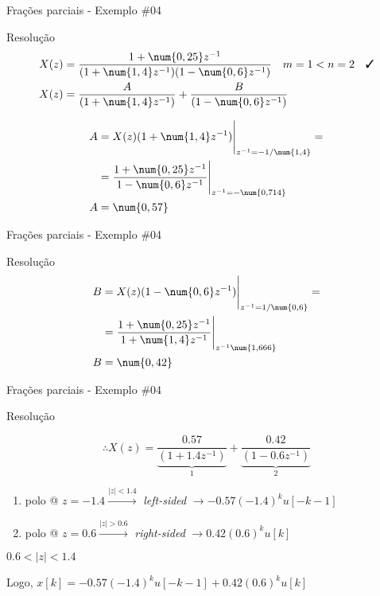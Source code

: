 \begin{frame}{Frações parciais - Exemplo \#04}
\begin{block}{Resolução}
	\begin{align*}
	X(z)&=\dfrac{1+\num{0,25}z^{-1}}{(1+\num{1,4}z^{-1})(1-\num{0,6}z^{-1})}\quad m=1<n=2\quad\text{\cmark}\\
	X(z)&=\dfrac{A}{(1+\num{1,4}z^{-1})}+\dfrac{B}{(1-\num{0,6}z^{-1})}
	\end{align*}
	
	\begin{align*}
		A&=\eval{X(z)(1+\num{1,4}z^{-1})}_{z^{-1}=-1/\num{1,4}}=\\
		&=\eval{\dfrac{1+\num{0,25}z^{-1}}{1-\num{0,6}z^{-1}}}_{z^{-1}=-\num{0,714}}\\
		A&=\num{0,57}
	\end{align*}
\end{block}
\end{frame}


\begin{frame}{Frações parciais - Exemplo \#04}
	\begin{block}{Resolução}
		\begin{align*}
		B&=\eval{X(z)(1-\num{0,6}z^{-1})}_{z^{-1}=1/\num{0,6}}=\\
		&=\eval{\dfrac{1+\num{0,25}z^{-1}}{1+\num{1,4}z^{-1}}}_{z^{-1}\num{1,666}}\\
		B&=\num{0,42}
		\end{align*}
	\end{block}
\end{frame}


\begin{frame}{Frações parciais - Exemplo \#04}
\begin{block}{Resolução}
	\begin{minipage}{0.45\linewidth}
		\[ \therefore X(z)=\underbrace{\dfrac{\num{0,57}}{(1+\num{1,4}z^{-1})}}_{1}+\underbrace{\dfrac{\num{0,42}}{(1-\num{0,6}z^{-1})}}_{2} \]
		
		\begin{enumerate}
			\item polo @ $ z=-\num{1,4} \overset{|z|<\num{1.4}}{\longrightarrow} $ \textit{left-sided} $ \rightarrow -\num{0,57}(-\num{1,4})^{k}u[-k-1] $
			\item polo @ $ z=\num{0,6} \overset{|z|>\num{0.6}}{\longrightarrow} $ \textit{right-sided} $ \rightarrow \num{0,42}(\num{0,6})^{k}u[k] $
		\end{enumerate}
	\end{minipage}
	\hfill
	\begin{minipage}{0.45\linewidth}
		\centering
		\scalebox{0.7}{}
		
		$ \num{0,6}<|z|<\num{1,4} $\hspace{2.08em}
	\end{minipage}

	\medskip
	
	Logo, $ x[k]=-\num{0,57}(-\num{1,4})^{k}u[-k-1]+\num{0,42}(\num{0,6})^{k}u[k] $
\end{block}
\end{frame}


